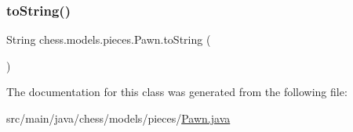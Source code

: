 \mbox{\label{classchess_1_1models_1_1pieces_1_1_pawn_a97538699aaa1cb69482ad9c218562450}} 
\subsubsection{\texorpdfstring{to\+String()}{toString()}}
{\footnotesize\ttfamily String chess.\+models.\+pieces.\+Pawn.\+to\+String (\begin{DoxyParamCaption}{ }\end{DoxyParamCaption})}



The documentation for this class was generated from the following file\+:\begin{DoxyCompactItemize}
\item 
src/main/java/chess/models/pieces/\mbox{\hyperlink{_pawn_8java}{Pawn.\+java}}\end{DoxyCompactItemize}

